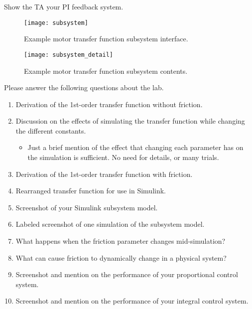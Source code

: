 \documentclass[openany,11pt,fleqn]{book} %
\begin{document}
\begin{assignment}
	Show the TA your PI feedback system.
\end{assignment}

\begin{figure}[tb]
    \centering\texttt{[image: subsystem]}
    \caption{Example motor transfer function subsystem interface.}
    \label{subsystem}
\end{figure}


\begin{figure}[b]
    \begin{center}
        \hspace*{-3.4cm}
        \texttt{[image: subsystem\_detail]}
        \caption{Example motor transfer function subsystem contents.}
        \label{subsystem_detail}
    \end{center}
\end{figure}

\begin{question}[Postlab 7]
	Please answer the following questions about the lab.
	\begin{enumerate}
		\item Derivation of the 1st-order transfer function without friction.
		\item Discussion on the effects of simulating the transfer function while changing the different constants.
		\begin{itemize}
			\item Just a brief mention of the effect that changing each parameter has on the simulation is sufficient. No need for details, or many trials. 
		\end{itemize}
		\item Derivation of the 1st-order transfer function with friction.
		\item Rearranged transfer function for use in Simulink.
		\item Screenshot of your Simulink subsystem model.
		\item Labeled screenshot of one simulation of the subsystem model.
		\item What happens when the friction parameter changes mid-simulation?
		\item What can cause friction to dynamically change in a physical system?
		\item Screenshot and mention on the performance of your proportional control system. 
		\item Screenshot and mention on the performance of your integral control system. 
		
	\end{enumerate}
\end{question}
\end{document}

